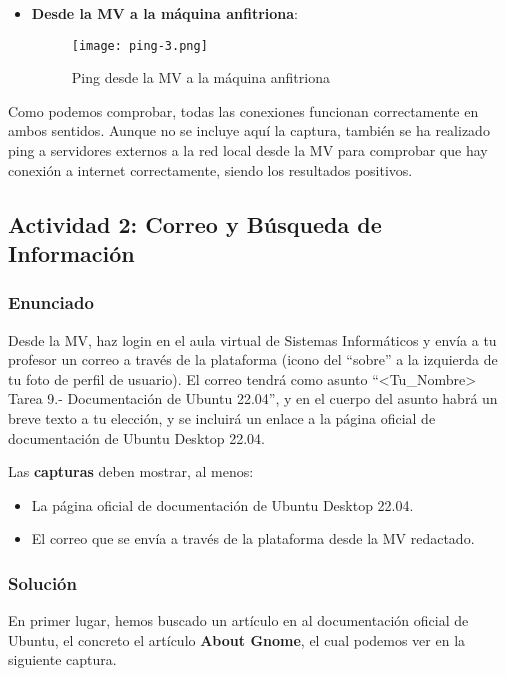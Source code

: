 \begin{enumerate}
\begin{itemize}
        \item \textbf{Desde la MV a la máquina anfitriona}:
        \begin{figure}[H]
            \centering
            \texttt{[image: ping-3.png]}
            \caption{Ping desde la MV a la máquina anfitriona}
        \end{figure}
    \end{itemize}
\end{enumerate}

Como podemos comprobar, todas las conexiones funcionan correctamente en ambos sentidos. Aunque no se incluye aquí la captura, también se ha realizado ping a servidores externos a la red local desde la MV para comprobar que hay conexión a internet correctamente, siendo los resultados positivos.

\subsection{Actividad 2: Correo y Búsqueda de Información}

\subsubsection{Enunciado}
Desde la MV, haz login en el aula virtual de Sistemas Informáticos y envía a tu profesor un correo a través de la plataforma (icono del ``sobre'' a la izquierda de tu foto de perfil de usuario). El correo tendrá como asunto ``<Tu\_Nombre> Tarea 9.- Documentación de Ubuntu 22.04'', y en el cuerpo del asunto habrá un breve texto a tu elección, y se incluirá un enlace a la página oficial de documentación de Ubuntu Desktop 22.04.

Las \textbf{capturas} deben mostrar, al menos:
\begin{itemize}
    \item La página oficial de documentación de Ubuntu Desktop 22.04.
    \item El correo que se envía a través de la plataforma desde la MV redactado.
\end{itemize}

\subsubsection{Solución}
En primer lugar, hemos buscado un artículo en al documentación oficial de Ubuntu, el concreto el artículo \textbf{About Gnome}, el cual podemos ver en la siguiente captura.

